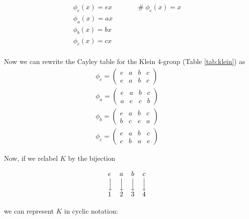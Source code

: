 \documentclass[11pt, oneside]{article}   	%
\theoremstyle{definition}
\DeclareMathOperator{\bda}{\Big \downarrow}
\begin{document}
\bigskip
\begin{equation*}
\begin{array}{llll}
\phi_{e}(x) = ex   &&&\quad  \mathrel{\#}  \phi_{e}(x) = x  \\     
\phi_{a}(x) = ax  \\    
\phi_{b}(x) = bx  \\       
\phi_{c}(x) = cx  \\                                        
\end{array}
\end{equation*}

\bigskip
\noindent
Now we can rewrite the Cayley table for the Klein 4-group (Table \ref{tab:klein}) as 
\bigskip
\begin{equation*}
\begin{array}{llll}
\phi_{e} = \begin{pmatrix} e & a & b & c \\ e & a & b & c \end{pmatrix}  \\
\phi_{a} = \begin{pmatrix} e & a & b & c \\ a & e & c & b \end{pmatrix}  \\
\phi_{b} = \begin{pmatrix} e & a & b & c \\ b & c & e & a \end{pmatrix}  \\
\phi_{c} = \begin{pmatrix} e & a & b & c \\ c & b & a & e \end{pmatrix}                                   
\end{array}
\end{equation*}

\bigskip
\noindent
Now, if we relabel $K$ by the bijection

\begin{equation*}
\begin{array}{l c c c c c c c c c c c c}
 e      & a       & b      & c \\
 \bda  & \bda & \bda & \bda \\
 1     & 2       & 3      & 4
\end{array}
\end{equation*}

\bigskip
\noindent
we can represent $K$ in cyclic notation:
\end{document}
